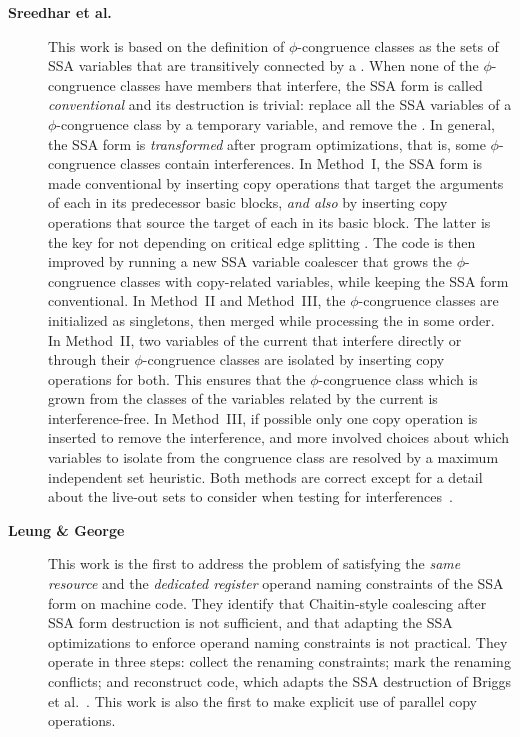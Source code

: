 \begin{description}
\item[\textbf{Sreedhar et al.~\cite{Sreedhar:1999:SAS}}] This work is based
on the definition of $\phi$-congruence classes as the sets of SSA variables that are transitively
connected by a \phifun. When none of the $\phi$-congruence classes have
members that interfere, the SSA form is called \emph{conventional} and its
destruction is trivial: replace all the SSA variables of a $\phi$-congruence
class by a temporary variable, and remove the \phifuns. In general, the
SSA form is \emph{transformed} after program optimizations, that is, some
$\phi$-congruence classes contain interferences.  In Method~I, the SSA form is
made conventional by inserting copy operations that target the arguments of each
\phifun in its predecessor basic blocks, \emph{and also} by inserting
copy operations that source the target of each \phifun in its basic
block. The latter is the key for not depending on critical edge splitting
\cite{Boissinot:2009:CGO}. The code is then improved by running a new SSA
variable coalescer that grows the $\phi$-congruence classes with copy-related
variables, while keeping the SSA form conventional. In Method~II and Method~III, the
$\phi$-congruence classes are initialized as singletons, then merged while
processing the \phifuns in some order. In Method~II, two variables of
the current \phifun that interfere directly or through their
$\phi$-congruence classes are isolated by inserting copy operations for both.
This ensures that the $\phi$-congruence class which is grown from the classes of
the variables related by the current \phifun is interference-free. In
Method~III, if possible only one copy operation is inserted to remove the
interference, and more involved choices about which variables to isolate from
the \phifun congruence class are resolved by a maximum independent set
heuristic.  Both methods are correct except for a detail about the live-out sets
to consider when testing for interferences~\cite{Boissinot:2009:CGO}.

\item[\textbf{Leung \& George~\cite{Leung:1999:PLDI}}] This work is the first to address the
problem of satisfying the \emph{same resource} and the \emph{dedicated register} operand
naming constraints of the SSA form on machine code. They identify that
Chaitin-style coalescing after SSA form destruction is not sufficient, and that
adapting the SSA optimizations to enforce operand naming constraints is not
practical.  They operate in three steps: collect the renaming constraints; mark
the renaming conflicts; and reconstruct code, which adapts the SSA destruction
of Briggs et al.~\cite{Briggs:1998:SPE}. This work is also the first to make
explicit use of parallel copy operations.


\end{description}
